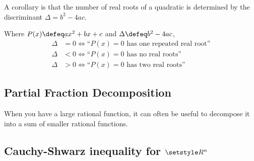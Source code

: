 A corollary is that the number of real roots of a quadratic is determined by the
discriminant \({\Delta = b^2 - 4ac}\).
\begin{corollary}
 Where \(P(x) \defeq ax^2 + bx + c\) and \(\Delta \defeq b^2 - 4ac\),
 \begin{align*}
  \Delta &= 0 \iff \text{``\(P(x) = 0\) has one repeated real root''} \\
  \Delta &< 0 \iff \text{``\(P(x) = 0\) has no real roots''} \\
  \Delta &> 0 \iff \text{``\(P(x) = 0\) has two real roots''}
 \end{align*}
\end{corollary}

\subsection{Partial Fraction Decomposition}

When you have a large rational function, it can often be useful to decompose it
into a sum of smaller rational functions.

\subsection[Cauchy-Shwarz inequality for
            \texorpdfstring{\(\Reals^n\)}{sequences of real numbers}]
           {Cauchy-Shwarz inequality for \boldmath\(\Reals^n\)}

